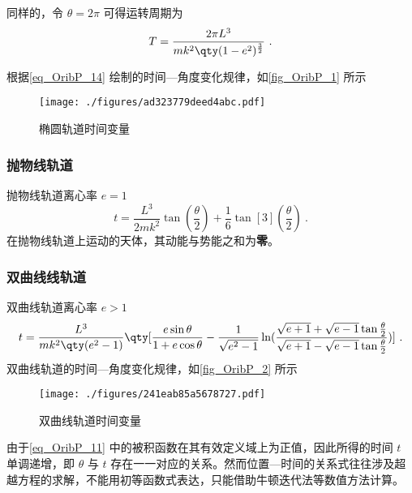 同样的，令 $\theta=2\pi$ 可得运转周期为
\begin{equation}
T=\frac{2\pi L^3}{mk^2\qty(1-e^2)^{\frac{3}{2}}}~.
\end{equation}

根据\autoref{eq_OribP_14} 绘制的时间—角度变化规律，如\autoref{fig_OribP_1} 所示
\begin{figure}[ht]
\centering
\texttt{[image: ./figures/ad323779deed4abc.pdf]}
\caption{椭圆轨道时间变量} \label{fig_OribP_1}
\end{figure}

\subsubsection{抛物线轨道}
抛物线轨道离心率 $e=1$
\begin{equation}
t = \frac{L^3}{2mk^2}\tan(\frac{\theta}{2})+\frac{1}{6}\tan[3](\frac{\theta}{2})~.
\end{equation}
在抛物线轨道上运动的天体，其动能与势能之和为\textbf{零}。

\subsubsection{双曲线线轨道}
双曲线轨道离心率 $e>1$
\begin{equation}
t = \frac{L^3}{mk^2\qty(e^2-1)}\qty[\frac{e\sin\theta}{1+e\cos\theta}-\frac{1}{\sqrt{e^2-1}}\ln(\frac{\sqrt{e+1}+\sqrt{e-1}\tan\frac{\theta}{2}}{\sqrt{e+1}-\sqrt{e-1}\tan\frac{\theta}{2}})]~.
\end{equation}
双曲线轨道的时间—角度变化规律，如\autoref{fig_OribP_2} 所示
\begin{figure}[ht]
\centering
\texttt{[image: ./figures/241eab85a5678727.pdf]}
\caption{双曲线轨道时间变量} \label{fig_OribP_2}
\end{figure}


由于\autoref{eq_OribP_11} 中的被积函数在其有效定义域上为正值，因此所得的时间 $t$ 单调递增，即 $\theta$ 与 $t$ 存在一一对应的关系。然而位置—时间的关系式往往涉及超越方程的求解，不能用初等函数式表达，只能借助牛顿迭代法等数值方法计算。

